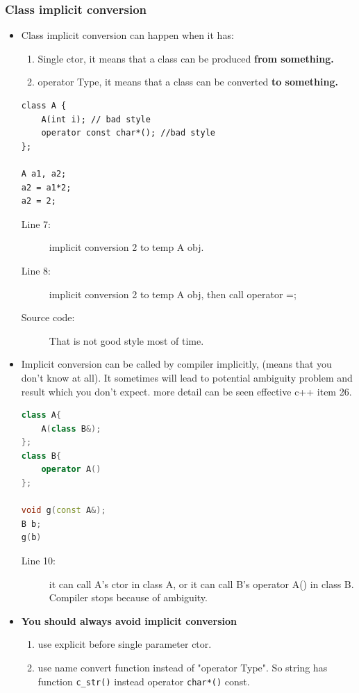 \documentclass[a4paper,11pt,twoside]{book}
\begin{document}
\subsubsection{Class implicit conversion}
\begin{itemize}
	
	\item Class implicit conversion can happen when it has:
	\begin{enumerate}
		\item Single ctor, it means that a class can be produced \textbf{from something.}
		\item operator Type, it means that a class can be converted \textbf{to something.}
	\end{enumerate}
	
\begin{lstlisting}
class A {
	A(int i); // bad style
	operator const char*(); //bad style
};
	
A a1, a2;
a2 = a1*2;  
a2 = 2;
\end{lstlisting}
\begin{description}
	\item[Line 7:] implicit conversion 2 to temp A obj.
	\item[Line 8:] implicit conversion 2 to temp A obj, then call operator =;
	\item[Source code:] That is not good style most of time.
\end{description}
	
	\item Implicit conversion can be called by compiler implicitly, (means that you don't know at all). It sometimes will lead to potential ambiguity problem and result which you don't expect. more detail can be seen effective c++ item 26.
\begin{lstlisting}[frame=single, language=c++]
class A{
	A(class B&);
};
class B{
	operator A()
};
	
void g(const A&);
B b;
g(b)
\end{lstlisting}
\begin{description}
	\item[Line 10:] 	it can call A's ctor in class A, or it can call B's operator A() in class B. Compiler stops because of ambiguity.
\end{description}	
	
	\item \textbf{You should always avoid implicit conversion}
	\begin{enumerate}
		\item use explicit before single parameter ctor.
		\item use name convert function instead of  "operator Type". So string has function \texttt{c\_str()} instead operator \texttt{char*()} const. 
	\end{enumerate}
	

\end{itemize}
\end{document}
